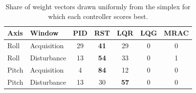 \begin{table}[!ht]
\centering
\caption{Share of weight vectors drawn uniformly from the simplex for which each controller scores best.}
\label{tab:sensitivity}
\begin{tabular}{llccccc}
\toprule
Axis & Window & PID & RST & LQR & LQG & MRAC \\
\midrule
Roll & Acquisition & 29 & \textbf{41} & 29 & 0 & 0 \\
Roll & Disturbance & 13 & \textbf{54} & 33 & 0 & 1 \\
Pitch & Acquisition & 4 & \textbf{84} & 12 & 0 & 0 \\
Pitch & Disturbance & 13 & 30 & \textbf{57} & 0 & 0 \\
\bottomrule
\end{tabular}
\end{table}